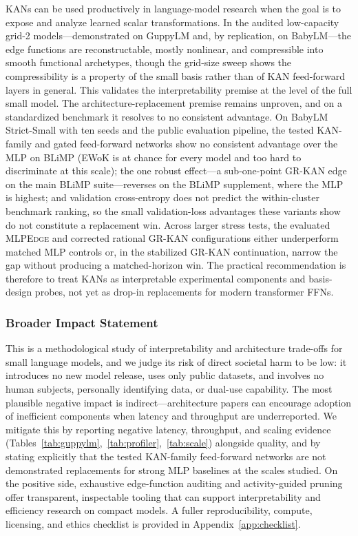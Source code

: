 \documentclass{article}
\newcommand{\modelname}[1]{\textsc{#1}}
\newcommand{\grkan}{\modelname{GR-KAN}}
\newcommand{\mlpedge}{\modelname{MLPEdge}}
\begin{document}
KANs can be used productively in language-model research when the goal is to expose and analyze learned scalar transformations. In the audited low-capacity grid-2 models---demonstrated on GuppyLM and, by replication, on BabyLM---the edge functions are reconstructable, mostly nonlinear, and compressible into smooth functional archetypes, though the grid-size sweep shows the compressibility is a property of the small basis rather than of KAN feed-forward layers in general. This validates the interpretability premise at the level of the full small model. The architecture-replacement premise remains unproven, and on a standardized benchmark it resolves to no consistent advantage. On BabyLM Strict-Small with ten seeds and the public evaluation pipeline, the tested KAN-family and gated feed-forward networks show no consistent advantage over the MLP on BLiMP (EWoK is at chance for every model and too hard to discriminate at this scale); the one robust effect---a sub-one-point \grkan{} edge on the main BLiMP suite---reverses on the BLiMP supplement, where the MLP is highest; and validation cross-entropy does not predict the within-cluster benchmark ranking, so the small validation-loss advantages these variants show do not constitute a replacement win. Across larger stress tests, the evaluated \mlpedge{} and corrected rational \grkan{} configurations either underperform matched MLP controls or, in the stabilized \grkan{} continuation, narrow the gap without producing a matched-horizon win. The practical recommendation is therefore to treat KANs as interpretable experimental components and basis-design probes, not yet as drop-in replacements for modern transformer FFNs.

\subsubsection*{Broader Impact Statement}

This is a methodological study of interpretability and architecture trade-offs for small language models, and we judge its risk of direct societal harm to be low: it introduces no new model release, uses only public datasets, and involves no human subjects, personally identifying data, or dual-use capability. The most plausible negative impact is indirect---architecture papers can encourage adoption of inefficient components when latency and throughput are underreported. We mitigate this by reporting negative latency, throughput, and scaling evidence (Tables~\ref{tab:guppylm},~\ref{tab:profiler},~\ref{tab:scale}) alongside quality, and by stating explicitly that the tested KAN-family feed-forward networks are not demonstrated replacements for strong MLP baselines at the scales studied. On the positive side, exhaustive edge-function auditing and activity-guided pruning offer transparent, inspectable tooling that can support interpretability and efficiency research on compact models. A fuller reproducibility, compute, licensing, and ethics checklist is provided in Appendix~\ref{app:checklist}.
\end{document}
